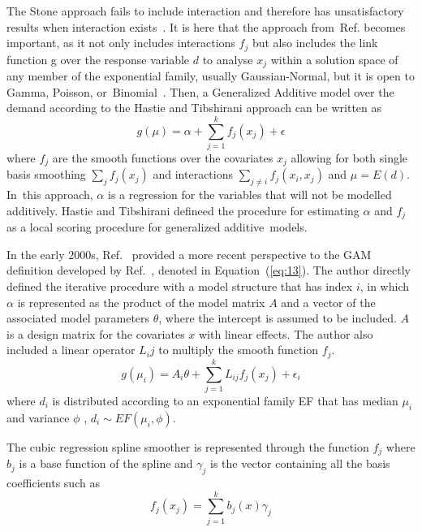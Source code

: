 \documentclass[energies,article,accept,pdftex,moreauthors]{Definitions/mdpi}
\begin{document}
     The Stone approach fails to include interaction and therefore has unsatisfactory results when interaction exists~\citep{Faraway2006ExtendingModels}. It is here that the approach from~Ref. \citep{Hastie1999GeneralizedModels} becomes important, as it not only includes interactions $f_j$ but also includes the  link function g over the response variable $d$ to analyse $x_j$  within a solution space of any member of the exponential family, usually Gaussian-Normal, but it is open to Gamma, Poisson, or~Binomial~\citep{Nisbet2018BasicOverview}. Then, a Generalized Additive model over the demand according to the Hastie and Tibshirani approach can be written as
\begin{equation}
     g(\mu)=\alpha + \sum_{j=1}^{k}f_j(x_j)+ \epsilon
     \end{equation}
where  $f_j$ are the smooth functions over the covariates $x_j$ allowing for both single basis smoothing \(\sum_j f_j (x_j)\) and interactions \(\sum_{j \neq i}f_j (x_i,x_j)\) and \(\mu=E(d)\). In~this approach, $\alpha$ is a regression for the variables that will not be modelled additively. %
  Hastie and Tibshirani defineed the procedure for estimating $\alpha$ and $f_j$ as a local scoring procedure for generalized additive~models.
     
     In the early 2000s, Ref.~\citep{Wood2006GeneralizedR} provided a more recent perspective to the GAM definition developed by Ref.~\citep{Hastie1999GeneralizedModels}, denoted in Equation~(\ref{eq:13}). The author %
      directly defined the iterative procedure with a model structure that has index $i$, in which $\alpha$ is represented as the product of the model matrix $A$ and a vector of the associated model parameters $\theta$, where the intercept is assumed to be included. $A$  is a design matrix for the covariates $x$ with linear effects. The author also included a linear operator $L_ij$ to multiply the smooth function $f_j$. %
\begin{equation}\label{eq:17}
         g(\mu_i)=A_i\theta+ \sum_{j=1}^{k}L_{ij}f_{j}(x_{j})+\epsilon_{i}
     \end{equation}
where $d_i$ is distributed according to an exponential family EF that has median $\mu_i$   and variance $\phi$ ,  \(d_i \sim EF(\mu_i,\phi)\).
     
     The cubic regression spline smoother is represented through the function $f_j$ where $b_j$ is a base function of the spline and $\gamma_j$ is the vector containing all the basis coefficients such as
\begin{equation}
         f_j(x_j)=\sum_{j=1}^{k}b_j(x)\gamma_j
     \end{equation}
     
\end{document}
